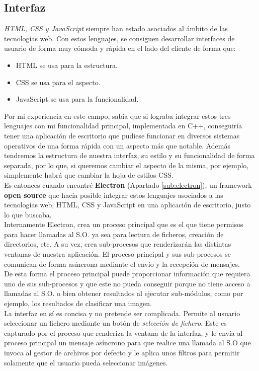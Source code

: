 \documentclass[a4paper,11pt]{book}
\begin{document}
\subsection{Interfaz}\label{sub:interfaz}
\textit{HTML, CSS y JavaScript} siempre han estado asociados al ámbito de las tecnologías web. Con estos lenguajes, se consiguen desarrollar interfaces de usuario de forma muy cómoda y rápida en el lado del cliente de forma que:
\begin{itemize}
	\item HTML se usa para la estructura.
	\item CSS se usa para el aspecto.
	\item JavaScript se usa para la funcionalidad.
\end{itemize}
Por mi experiencia en este campo, sabía que si lograba integrar estos tres lenguajes con mi funcionalidad principal, implementada en C++, conseguiría tener una aplicación de escritorio que pudiese funcionar en diversos sistemas operativos de una forma rápida con un aspecto más que notable. Además tendremos la estructura de nuestra interfaz, su estilo y su funcionalidad de forma separada, por lo que, si queremos cambiar el aspecto de la misma, por ejemplo, simplemente habrá que cambiar la hoja de estilos CSS.\\
Es entonces cuando encontré \textbf{Electron} (Apartado \ref{sub:electron}), un framework \textbf{open source} que hacía posible integrar estos lenguajes asociados a las tecnologías web, HTML, CSS y JavaScript en una aplicación de escritorio, justo lo que buscaba.\\
Internamente Electron, crea un proceso principal que es el que tiene permisos para hacer llamadas al S.O. ya sea para lectura de ficheros, creación de directorios, etc. A su vez, crea sub-procesos que renderizarán las distintas ventanas de nuestra aplicación. El proceso principal y sus sub-procesos se comunican de forma asíncrona mediante el envío y la recepción de mensajes.\\
De esta forma el proceso principal puede proporcionar información que requiera uno de sus sub-procesos y que este no pueda conseguir porque no tiene acceso a llamadas al S.O. o bien obtener resultados al ejecutar sub-módulos, como por ejemplo, los resultados de clasificar una imagen.\\
La interfaz en sí es concisa y no pretende ser complicada. Permite al usuario seleccionar un fichero mediante un botón de \textit{selección de fichero}. Este es capturado por el proceso que renderiza la ventana de la interfaz, y le envía al proceso principal un mensaje asíncrono para que realice una llamada al S.O que invoca al gestor de archivos por defecto y le aplica unos filtros para permitir solamente que el usuario pueda seleccionar imágenes.\\
\end{document}
